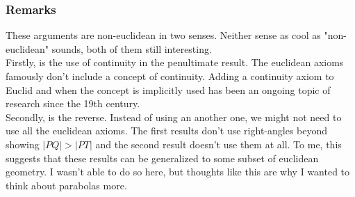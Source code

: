 \subsubsection{Remarks}
These arguments are non-euclidean in two senses.
Neither sense as cool as "non-euclidean" sounds,
both of them still interesting.
\\

Firstly, is the use of continuity in the penultimate result.
The euclidean axioms famously don't include a concept of continuity.
Adding a continuity axiom to Euclid and when the concept is implicitly used has been an ongoing topic of research since the 19th century.
\\

Secondly, is the reverse.
Instead of using an another one,
we might not need to use all the euclidean axioms.
The first results don't use right-angles beyond showing $|PQ| > |PT|$ and the second result doesn't use them at all.
To me, this suggests that these results can be generalized to some subset of euclidean geometry.
I wasn't able to do so here,
but thoughts like this are why I wanted to think about parabolas more.

%
%
%

%
%
%
